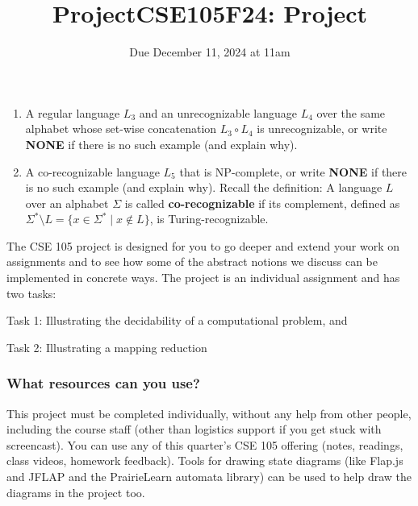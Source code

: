 \begin{enumerate}[wide, labelwidth=!, labelindent=0pt]
\begin{enumerate}
    \item\gradeCorrect A regular language $L_3$ and an unrecognizable
        language $L_4$ over the same alphabet whose set-wise concatenation $L_3 \circ L_4$ is unrecognizable, 
        or write {\bf NONE} if there is no such example (and explain why).
    
    
    \item\gradeComplete A co-recognizable language $L_5$ that is NP-complete,
         or write {\bf NONE} if there is no such example (and explain why).
        Recall the definition: A language $L$ over an  alphabet $\Sigma$ is called {\bf co-recognizable} if its complement,  defined
        as $\Sigma^* \setminus L  = \{ x  \in  \Sigma^* \mid x \notin  L \}$, is Turing-recognizable.
        
\end{enumerate}
    

\end{enumerate}
\newpage
\titleformat{\subsubsection}[runin]
   {\normalfont\bfseries}{}{}{}
   
\title{ProjectCSE105F24: Project}
\date{Due December 11, 2024 at 11am}


\maketitle

\thispagestyle{fancy}


The CSE 105 project is designed for you to go deeper and 
extend your work on assignments 
and to see how some of the abstract notions we discuss can 
be implemented in concrete ways. 
The project is an individual assignment and has two tasks: 

Task 1: Illustrating the decidability of a computational problem, and

Task 2: Illustrating a mapping reduction

\subsubsection*{What resources can you use?} This project must be completed individually, 
without any help from other people, including the course staff (other than logistics support if 
you get stuck with screencast).
You can use any of this quarter's CSE 105 offering (notes, readings, class videos, homework feedback). 
Tools for drawing state diagrams (like Flap.js and JFLAP and the PrairieLearn automata library) can be used to help draw the diagrams 
in the project too.

